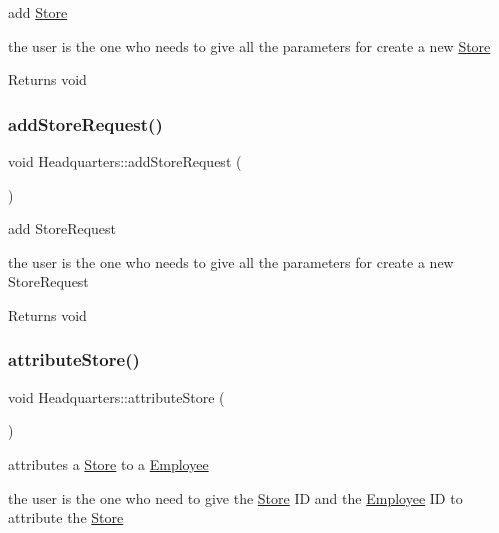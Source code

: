 add \hyperlink{class_store}{Store} 

the user is the one who needs to give all the parameters for create a new \hyperlink{class_store}{Store}

\begin{DoxyReturn}{Returns}
void 
\end{DoxyReturn}
\mbox{\label{class_headquarters_a260cfd15b81cd073a2b597ac892a2142}} 
\subsubsection{\texorpdfstring{add\+Store\+Request()}{addStoreRequest()}}
{\footnotesize\ttfamily void Headquarters\+::add\+Store\+Request (\begin{DoxyParamCaption}{ }\end{DoxyParamCaption})}



add Store\+Request 

the user is the one who needs to give all the parameters for create a new Store\+Request

\begin{DoxyReturn}{Returns}
void 
\end{DoxyReturn}
\mbox{\label{class_headquarters_ad162fb3833c24833a0ac83b50f3df91b}} 
\subsubsection{\texorpdfstring{attribute\+Store()}{attributeStore()}}
{\footnotesize\ttfamily void Headquarters\+::attribute\+Store (\begin{DoxyParamCaption}{ }\end{DoxyParamCaption})}



attributes a \hyperlink{class_store}{Store} to a \hyperlink{class_employee}{Employee} 

the user is the one who need to give the \hyperlink{class_store}{Store} ID and the \hyperlink{class_employee}{Employee} ID to attribute the \hyperlink{class_store}{Store}

